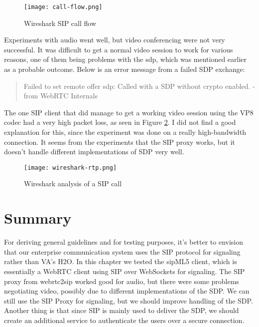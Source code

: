 \begin{figure}[here]
\centerline{\texttt{[image: call-flow.png]}}
\caption{Wireshark SIP call flow}
\label{fig:wireshark-sip-call-flow}
\end{figure}

\newpage
Experiments with audio went well, but video conferencing were not very successful. It was difficult to get a normal video session to work for various reasons, one of them being problems with the \gls{sdp}, which was mentioned earlier as a probable outcome. Below is an error message from a failed SDP exchange:

\begin{quote}
Failed to set remote offer sdp: Called with a SDP without crypto enabled. -from WebRTC Internals
\end{quote}

The one SIP client that did manage to get a working video session using the VP8 codec had a very high packet loss, as seen in Figure \ref{fig:wireshark-sip-call}. I did not find a good explanation for this, since the experiment was done on a really high-bandwidth connection. It seems from the experiments that the SIP proxy works, but it doesn't handle different implementations of SDP very well.

\begin{figure}[here]
\centerline{\texttt{[image: wireshark-rtp.png]}}
\caption{Wireshark analysis of a SIP call}
\label{fig:wireshark-sip-call}
\end{figure}

\newpage
\section{Summary}
For deriving general guidelines and for testing purposes, it's better to envision that our enterprise communication system uses the SIP protocol for signaling rather than VA's H2O. In this chapter we tested the sipML5 client, which is essentially a WebRTC client using SIP over WebSockets for signaling. The SIP proxy from webrtc2sip worked good for audio, but there were some problems negotiating video, possibly due to different implementations of the SDP. We can still use the SIP Proxy for signaling, but we should improve handling of the SDP. Another thing is that since SIP is mainly used to deliver the SDP, we should create an additional service to authenticate the users over a secure connection.